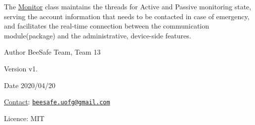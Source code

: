 The \hyperlink{class_monitor}{Monitor} class maintains the threads for Active and Passive monitoring state, serving the account information that needs to be contacted in case of emergency, and facilitates the real-\/time connection between the communication module(package) and the administrative, device-\/side features.

\begin{DoxyAuthor}{Author}
Bee\+Safe Team, Team 13
\end{DoxyAuthor}
\begin{DoxyVersion}{Version}
v1.
\end{DoxyVersion}
\begin{DoxyDate}{Date}
2020/04/20
\end{DoxyDate}
\hyperlink{class_contact}{Contact}\+: \href{mailto:beesafe.uofg@gmail.com}{\tt beesafe.\+uofg@gmail.\+com}

Licence\+: M\+IT 